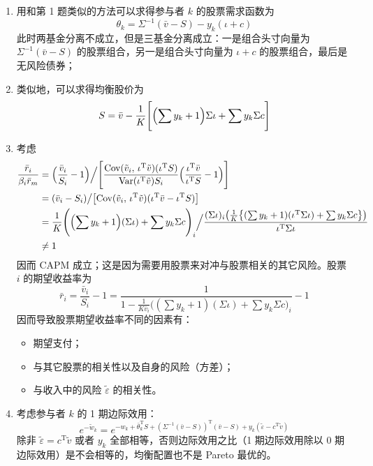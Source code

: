 \begin{solution}
\begin{enumerate}[label=(\alph*)]
    \item 用和第 1 题类似的方法可以求得参与者 $k$ 的股票需求函数为
    \[
        \theta_{k}=\Sigma^{-1}(\bar{v}-S)-y_{k}(\iota+c)
    \]
    此时两基金分离不成立，但是三基金分离成立：一是组合头寸向量为 $\Sigma^{-1}(\bar{v}-S)$ 的股票组合，另一是组合头寸向量为 $\iota+c$ 的股票组合，最后是无风险债券；

    \item 类似地，可以求得均衡股价为
    \[
        S=\bar{v}-\frac{1}{K}\Biggl[\Bigl(\sum y_{k}+1\Bigr)\Sigma\iota+\sum y_{k}\Sigma c\Biggr]
    \]

    \item 考虑
    \[
        \begin{aligned}
            \frac{\bar{r}_{i}}{\beta_{i}\bar{r}_{m}}
            &=\Bigl(\frac{\bar{v}_{i}}{S_{i}}-1\Bigr)\Big/\Biggl[\frac{\operatorname{Cov}(\tilde{v}_{i},\,\iota^{\mathrm{T}}\tilde{v})(\iota^{\mathrm{T}}S)}{\operatorname{Var}(\iota^{\mathrm{T}}\tilde{v})S_{i}}\Bigl(\frac{\iota^{\mathrm{T}}\bar{v}}{\iota^{\mathrm{T}}S}-1\Bigr)\Biggr]\\
            &=(\bar{v}_{i}-S_{i})\big/\bigl[\operatorname{Cov}(\tilde{v}_{i},\,\iota^{\mathrm{T}}\tilde{v})(\iota^{\mathrm{T}}\bar{v}-\iota^{\mathrm{T}}S)\bigr]\\
            &=\frac{1}{K}\Biggl(\Bigl(\sum y_{k}+1\Bigr)(\Sigma\iota)+\sum y_{k}\Sigma c\Biggr)_{i}\Big/\frac{(\Sigma\iota)_{i}\bigl(\tfrac{1}{K}\bigl\{(\sum y_{k}+1)(\iota^{\mathrm{T}}\Sigma\iota)+\sum y_{k}\Sigma c\bigr\}\bigr)}{\iota^{\mathrm{T}}\Sigma\iota}\\
            &\ne 1
        \end{aligned}
    \]
    因而 CAPM 成立；这是因为需要用股票来对冲与股票相关的其它风险。股票 $i$ 的期望收益率为
    \[
        \bar{r}_{i}=\frac{\bar{v}_{i}}{S_{i}}-1=\frac{1}{1-\frac{1}{K\bar{v}_{i}}\bigl((\sum y_{k}+1)(\Sigma\iota)+\sum y_{k}\Sigma c\bigr)_{i}}-1
    \]
    因而导致股票期望收益率不同的因素有：
    \begin{itemize}
        \item 期望支付；
        \item 与其它股票的相关性以及自身的风险（方差）；
        \item 与收入中的风险 $\tilde{\varepsilon}$ 的相关性。
    \end{itemize}

    \item 考虑参与者 $k$ 的 1 期边际效用：
    \[
        e^{-\tilde{w}_{k}}=e^{-w_{k}+\bar{\theta}_{k}^{\mathrm{T}}S+(\Sigma^{-1}(\bar{v}-S))^{\mathrm{T}}(\bar{v}-S)+y_{k}(\tilde{\varepsilon}-c^{\mathrm{T}}\tilde{v})}
    \]
    除非 $\tilde{\varepsilon}=c^{\mathrm{T}}\tilde{v}$ 或者 $y_{k}$ 全部相等，否则边际效用之比（1 期边际效用除以 0 期边际效用）是不会相等的，均衡配置也不是 Pareto 最优的。
\end{enumerate}
\end{solution}

